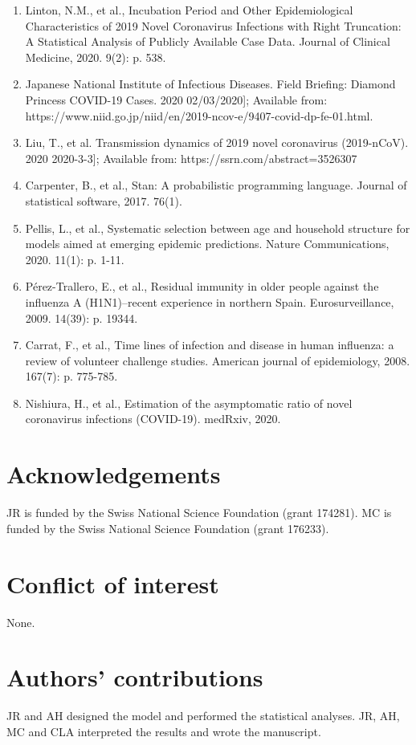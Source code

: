 \documentclass{article}
\begin{document}
\begin{enumerate}
\item	Linton, N.M., et al., Incubation Period and Other Epidemiological Characteristics of 2019 Novel Coronavirus Infections with Right Truncation: A Statistical Analysis of Publicly Available Case Data. Journal of Clinical Medicine, 2020. 9(2): p. 538.
\item	Japanese National Institute of Infectious Diseases. Field Briefing: Diamond Princess COVID-19 Cases. 2020  02/03/2020]; Available from: https://www.niid.go.jp/niid/en/2019-ncov-e/9407-covid-dp-fe-01.html.
\item	Liu, T., et al. Transmission dynamics of 2019 novel coronavirus (2019-nCoV). 2020  2020-3-3]; Available from: https://ssrn.com/abstract=3526307 
\item	Carpenter, B., et al., Stan: A probabilistic programming language. Journal of statistical software, 2017. 76(1).
\item	Pellis, L., et al., Systematic selection between age and household structure for models aimed at emerging epidemic predictions. Nature Communications, 2020. 11(1): p. 1-11.
\item	Pérez-Trallero, E., et al., Residual immunity in older people against the influenza A (H1N1)–recent experience in northern Spain. Eurosurveillance, 2009. 14(39): p. 19344.
\item	Carrat, F., et al., Time lines of infection and disease in human influenza: a review of volunteer challenge studies. American journal of epidemiology, 2008. 167(7): p. 775-785.
\item	Nishiura, H., et al., Estimation of the asymptomatic ratio of novel coronavirus infections (COVID-19). medRxiv, 2020.
\end{enumerate}


\section*{Acknowledgements}
JR is funded by the Swiss National Science Foundation (grant 174281). MC is funded
by the Swiss National Science Foundation (grant 176233).
\section*{Conflict of interest}
None.

\section*{Authors' contributions}

JR and AH designed the model and performed the statistical analyses. JR, AH, MC
and CLA interpreted the results and wrote the manuscript.
\end{document}
